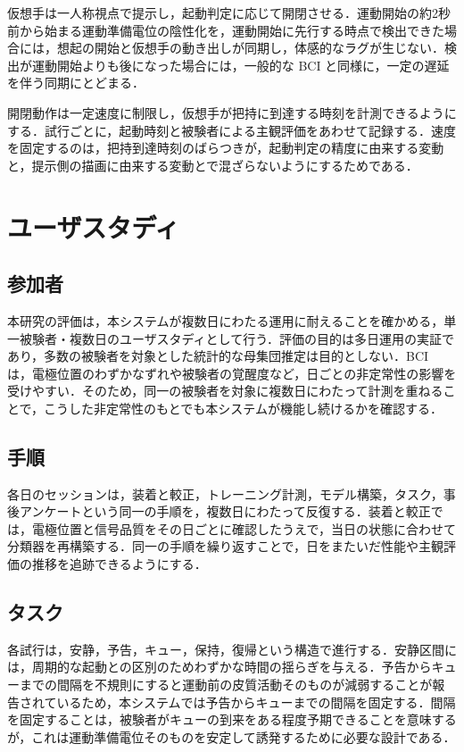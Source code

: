 \documentclass[twoside]{wiss}
\begin{document}
仮想手は一人称視点で提示し，起動判定に応じて開閉させる．運動開始の約2秒前から始まる運動準備電位の陰性化を，運動開始に先行する時点で検出できた場合には，想起の開始と仮想手の動き出しが同期し，体感的なラグが生じない．検出が運動開始よりも後になった場合には，一般的な BCI と同様に，一定の遅延を伴う同期にとどまる．

開閉動作は一定速度に制限し，仮想手が把持に到達する時刻を計測できるようにする．試行ごとに，起動時刻と被験者による主観評価をあわせて記録する．速度を固定するのは，把持到達時刻のばらつきが，起動判定の精度に由来する変動と，提示側の描画に由来する変動とで混ざらないようにするためである．

\section{ユーザスタディ}

\subsection{参加者}

本研究の評価は，本システムが複数日にわたる運用に耐えることを確かめる，単一被験者・複数日のユーザスタディとして行う．評価の目的は多日運用の実証であり，多数の被験者を対象とした統計的な母集団推定は目的としない．BCI は，電極位置のわずかなずれや被験者の覚醒度など，日ごとの非定常性の影響を受けやすい．そのため，同一の被験者を対象に複数日にわたって計測を重ねることで，こうした非定常性のもとでも本システムが機能し続けるかを確認する．

\subsection{手順}

各日のセッションは，装着と較正，トレーニング計測，モデル構築，タスク，事後アンケートという同一の手順を，複数日にわたって反復する．装着と較正では，電極位置と信号品質をその日ごとに確認したうえで，当日の状態に合わせて分類器を再構築する．同一の手順を繰り返すことで，日をまたいだ性能や主観評価の推移を追跡できるようにする．

\subsection{タスク}

各試行は，安静，予告，キュー，保持，復帰という構造で進行する．安静区間には，周期的な起動との区別のためわずかな時間の揺らぎを与える．予告からキューまでの間隔を不規則にすると運動前の皮質活動そのものが減弱することが報告されているため\cite{cui2009}，本システムでは予告からキューまでの間隔を固定する．間隔を固定することは，被験者がキューの到来をある程度予期できることを意味するが，これは運動準備電位そのものを安定して誘発するために必要な設計である．
\end{document}
